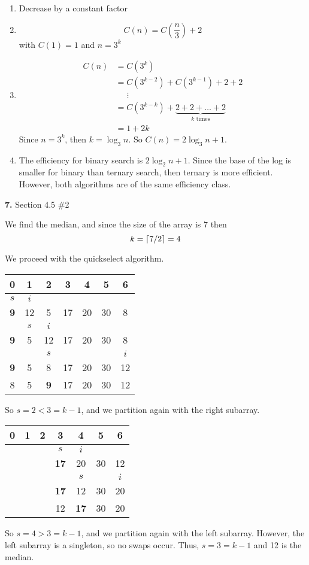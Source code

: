 \documentclass[letterpaper, 11pt]{article}
\newcommand{\hwnumbersec}[3]{\medskip \noindent\textbf{#1.} Section #2 \##3 \smallskip}
\DeclarePairedDelimiter{\ceil}{\lceil}{\rceil}
\begin{document}
\begin{enumerate}[label = (\alph*)]
  \item Decrease by a constant factor
  \item \[C(n) = C\left(\frac{n}{3}\right) + 2\]
    with \(C(1) = 1\) and \(n = 3^k\)
  \item 
    \begin{align*}
      C(n) &= C(3^k) \\
           &= C(3^{k-2}) + C(3^{k-1}) + 2 + 2\\
           &\;\;\;\;\;\vdots \\
           &= C(3^{k-k}) + \underbrace{2 + 2 + \dots + 2}_{k \text{ times}}\\
           &= 1 + 2k
    \end{align*}
    Since \(n = 3^k\), then \(k = \log_3 n\). So \(C(n) = 2\log_3 n + 1\).
  \item The efficiency for binary search is \(2\log_2 n + 1\). Since the base
    of the log is smaller for binary than ternary search, then ternary is more
    efficient. However, both algorithms are of the same efficiency class. 
\end{enumerate}

\hwnumbersec{7}{4.5}{2}

We find the median, and since the size of the array is 7 then 
\[k = \ceil*{7 / 2} = 4\]

We proceed with the quickselect algorithm. 

\begin{center}
  \begin{tabular}{ccccccc}
    0 & 1 & 2 & 3 & 4 & 5 & 6 \\
    \hline
    \(s\) & \(i\) \\
    \textbf{9} & 12 & 5 & 17 & 20 & 30 & 8 \\
               & \(s\) & \(i\) \\
    \textbf{9} & 5 & 12 & 17 & 20 & 30 & 8 \\
               & & \(s\)  & & & &  \(i\) \\
    \textbf{9} & 5 & 8 & 17 & 20 & 30 & 12 \\
     8 & 5 & \textbf{9} & 17 & 20 & 30 & 12 \\
  \end{tabular}
\end{center}

So \(s = 2 < 3 = k - 1\), and we partition again with the right subarray.
\begin{center}
  \begin{tabular}{ccccccc}
    0 & 1 & 2 & 3 & 4 & 5 & 6 \\
    \hline
      & & & \(s\) & \(i\) \\
      & & & \textbf{17} & 20 & 30 & 12 \\
      & & & & \(s\) & & \(i\) \\
      & & & \textbf{17} & 12 & 30 & 20 \\
      & & & 12 & \textbf{17} & 30 & 20 \\
  \end{tabular}
\end{center}

So \(s = 4 > 3 = k - 1\), and we partition again with the left subarray.
However, the left subarray is a singleton, so no swaps occur. Thus, \(s = 3 = k
- 1\) and 12 is the median. 
\end{document}
